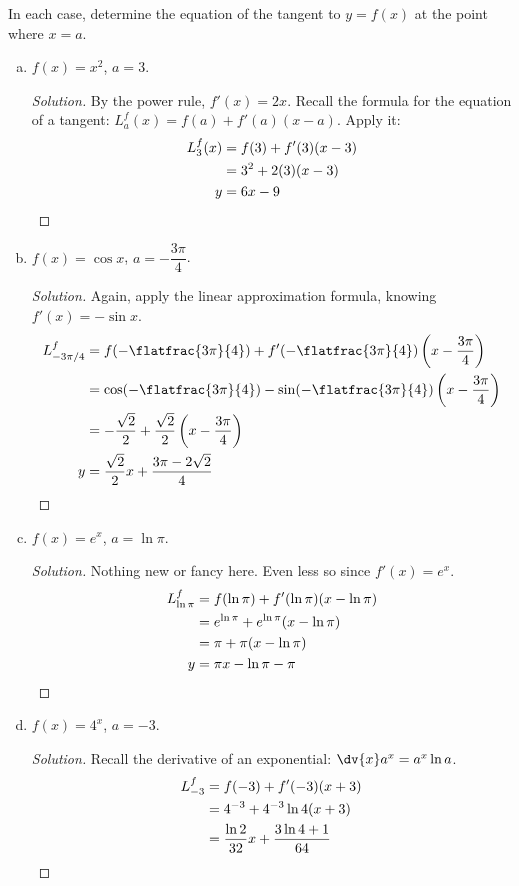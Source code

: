 \question In each case, determine the equation of the tangent to $y=f(x)$ at the point where $x=a$.
\begin{enumerate}[(a)]
  \item $f(x)=x^2$, $a=3$.
        \begin{proof}[Solution]
          By the power rule, $f'(x) = 2x$.
          Recall the formula for the equation of a tangent: $L_a^f(x)=f(a)+f'(a)(x-a)$.
          Apply it:
          \begin{align*}
            L_3^f(x) & = f(3)+f'(3)(x-3) \\
                     & = 3^2 + 2(3)(x-3) \\
            y        & = 6x - 9 \qedhere
          \end{align*}
        \end{proof}
  \item $f(x)=\cos x$, $a=-\dfrac{3\pi}{4}$.
        \begin{proof}[Solution]
          Again, apply the linear approximation formula, knowing $f'(x)=-\sin x$.
          \begin{align*}
            L_{-3\pi/4}^f
              & = f(-\flatfrac{3\pi}{4}) + f'(-\flatfrac{3\pi}{4})\left(x-\frac{3\pi}{4}\right)      \\
              & = \cos(-\flatfrac{3\pi}{4}) - \sin(-\flatfrac{3\pi}{4})\left(x-\frac{3\pi}{4}\right) \\
              & = -\frac{\sqrt{2}}{2} + \frac{\sqrt{2}}{2}\left(x-\frac{3\pi}{4}\right)              \\
            y & = \frac{\sqrt{2}}{2}x + \frac{3\pi-2\sqrt{2}}{4} \qedhere
          \end{align*}
        \end{proof}
  \item $f(x)=e^x$, $a=\ln\pi$.
        \begin{proof}[Solution]
          Nothing new or fancy here. Even less so since $f'(x)=e^x$.
          \begin{align*}
            L_{\ln\pi}^f & = f(\ln\pi) + f'(\ln\pi)(x-\ln\pi)  \\
                         & = e^{\ln\pi} + e^{\ln\pi}(x-\ln\pi) \\
                         & = \pi + \pi(x-\ln\pi)               \\
            y            & = \pi x - \ln\pi - \pi \qedhere
          \end{align*}
        \end{proof}
  \item $f(x)=4^x$, $a=-3$.
        \begin{proof}[Solution]
          Recall the derivative of an exponential: $\dv{x}a^x = a^x\ln a$.
          \begin{align*}
            L_{-3}^f & = f(-3) + f'(-3)(x+3)                              \\
                     & = 4^{-3} + 4^{-3}\ln 4(x+3)                        \\
                     & = \frac{\ln 2}{32}x + \frac{3\ln 4+1}{64} \qedhere
          \end{align*}
        \end{proof}
\end{enumerate}


